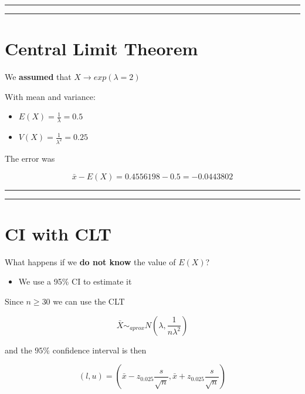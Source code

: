 \documentclass[
]{book}
\providecommand{\tightlist}{%
  \setlength{\itemsep}{0pt}\setlength{\parskip}{0pt}}
\begin{document}
\begin{center}\rule{0.5\linewidth}{0.5pt}\end{center}

\begin{center}\rule{0.5\linewidth}{0.5pt}\end{center}

\hypertarget{central-limit-theorem-4}{%
\section{Central Limit Theorem}\label{central-limit-theorem-4}}

We \textbf{assumed} that \(X \rightarrow exp(\lambda=2)\)

With mean and variance:

\begin{itemize}
\tightlist
\item
  \(E(X)=\frac{1}{\lambda}=0.5\)
\item
  \(V(X)=\frac{1}{\lambda^2}=0.25\)
\end{itemize}

The error was

\[\bar{x}-E(X)=0.4556198-0.5=-0.0443802\]

\begin{center}\rule{0.5\linewidth}{0.5pt}\end{center}

\begin{center}\rule{0.5\linewidth}{0.5pt}\end{center}

\hypertarget{ci-with-clt}{%
\section{CI with CLT}\label{ci-with-clt}}

What happens if we \textbf{do not know} the value of \(E(X)\)?

\begin{itemize}
\tightlist
\item
  We use a 95\% CI to estimate it
\end{itemize}

Since \(n \geq 30\) we can use the CLT

\[\bar{X} \sim_{aprox}  N(\lambda, \frac{1}{n\lambda^2})\]

and the \(95\%\) confidence interval is then

\[(l,u)=(\bar{x}-z_{0.025} \frac{s}{\sqrt{n}}, \bar{x}+z_{0.025} \frac{s}{\sqrt{n}})\]
\end{document}
